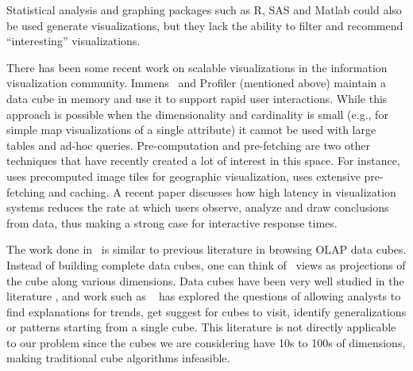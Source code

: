 Statistical analysis and graphing packages such as R, SAS and Matlab could also
be used generate visualizations, but they lack the ability to filter and
recommend ``interesting'' visualizations. 

There has been some recent work on
scalable visualizations in the information visualization community. Immens~\cite{2013-immens} and Profiler (mentioned above) maintain a data cube in memory and use it to support rapid user interactions. While this approach is possible when the dimensionality
and cardinality is small (e.g., for simple map visualizations of a single
attribute) it cannot be used with large tables and ad-hoc queries.
Pre-computation and pre-fetching are two other techniques that have recently
created a lot of interest in this space. For instance, \cite{hotmap} uses
precomputed image tiles for geographic visualization,
\cite{doshi2003prefetching} uses extensive pre-fetching and caching. 
A recent paper \cite{2014-viz-latency} discusses how high
latency in visualization systems reduces the rate at which users observe,
analyze and draw conclusions from data, thus making a strong case for
interactive response times.



The work done in \VizRecDB\ is similar to previous literature in
browsing OLAP data cubes. 
Instead of building complete data cubes,
one can think of \VizRecDB\ views as projections of the cube along various
dimensions.
 Data cubes have been very well studied in the literature
\cite{DBLP:conf/SIGMOD/HarinarayanRU96, DBLP:jounral/DMKD/GrayCBLR97}, and work such as
~\cite{DBLP:conf/vldb/Sarawagi99, DBLP:conf/vldb/SatheS01,
DBLP:conf/vldb/Sarawagi00, DBLP:conf/SIGKDD/OrdonezC09} has explored the
questions of allowing analysts to find explanations for trends, get suggest for
cubes to visit, identify generalizations or patterns starting from a single
cube. 
This literature is not directly applicable to our problem since the cubes we
are considering have 10s to 100s of dimensions, making traditional cube
algorithms infeasible. 


